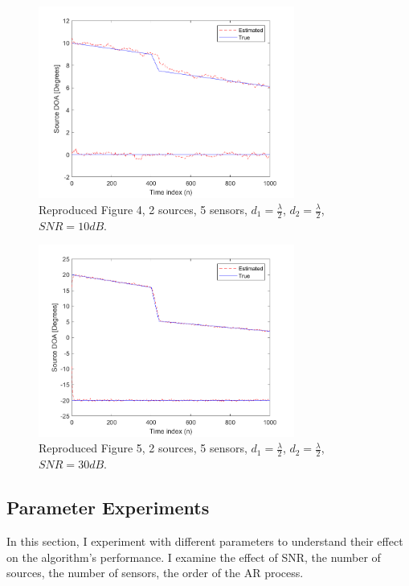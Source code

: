 \documentclass{article}
\begin{document}
\begin{figure}[htbp]
    \centerline{
    \includegraphics[width=0.75\textwidth]{Fig4.png}}
    \caption{Reproduced Figure 4, 2 sources, 5 sensors, $d_1 = \frac{\lambda}{2}$, $d_2 = \frac{\lambda}{2}$, $SNR = 10 dB$.}
    \label{fig:figure 3}
\end{figure}

\begin{figure}[htbp]
    \centerline{
    \includegraphics[width=0.75\textwidth]{Fig5.png}}
    \caption{Reproduced Figure 5, 2 sources, 5 sensors, $d_1 = \frac{\lambda}{2}$, $d_2 = \frac{\lambda}{2}$, $SNR = 30 dB$.}
    \label{fig:figure 4}
\end{figure}



\subsection{Parameter Experiments}
In this section, I experiment with different parameters to understand their effect on the algorithm's performance.
I examine the effect of SNR, the number of sources, the number of sensors, the order of the AR process.
\end{document}
